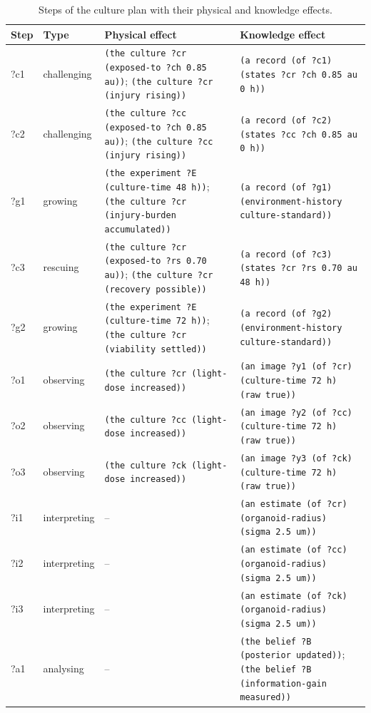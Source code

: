 \documentclass[10pt,a4paper]{article}
\begin{document}
\begin{table}[tbp]\centering\footnotesize
\caption{Steps of the culture plan with their physical and knowledge effects.}\label{tab:culture_steps}
\begin{tabularx}{\linewidth}{llXX}\toprule
\textbf{Step} & \textbf{Type} & \textbf{Physical effect} & \textbf{Knowledge effect} \\\midrule
?c1 & challenging & \texttt{(the culture ?cr (exposed-\allowbreak{}to ?ch 0.85 au))}; \texttt{(the culture ?cr (injury rising))} & \texttt{(a record (of ?c1) (states ?cr ?ch 0.85 au 0 h))} \\
?c2 & challenging & \texttt{(the culture ?cc (exposed-\allowbreak{}to ?ch 0.85 au))}; \texttt{(the culture ?cc (injury rising))} & \texttt{(a record (of ?c2) (states ?cc ?ch 0.85 au 0 h))} \\
?g1 & growing & \texttt{(the experiment ?E (culture-\allowbreak{}time 48 h))}; \texttt{(the culture ?cr (injury-\allowbreak{}burden accumulated))} & \texttt{(a record (of ?g1) (environment-\allowbreak{}history culture-\allowbreak{}standard))} \\
?c3 & rescuing & \texttt{(the culture ?cr (exposed-\allowbreak{}to ?rs 0.70 au))}; \texttt{(the culture ?cr (recovery possible))} & \texttt{(a record (of ?c3) (states ?cr ?rs 0.70 au 48 h))} \\
?g2 & growing & \texttt{(the experiment ?E (culture-\allowbreak{}time 72 h))}; \texttt{(the culture ?cr (viability settled))} & \texttt{(a record (of ?g2) (environment-\allowbreak{}history culture-\allowbreak{}standard))} \\
?o1 & observing & \texttt{(the culture ?cr (light-\allowbreak{}dose increased))} & \texttt{(an image ?y1 (of ?cr) (culture-\allowbreak{}time 72 h) (raw true))} \\
?o2 & observing & \texttt{(the culture ?cc (light-\allowbreak{}dose increased))} & \texttt{(an image ?y2 (of ?cc) (culture-\allowbreak{}time 72 h) (raw true))} \\
?o3 & observing & \texttt{(the culture ?ck (light-\allowbreak{}dose increased))} & \texttt{(an image ?y3 (of ?ck) (culture-\allowbreak{}time 72 h) (raw true))} \\
?i1 & interpreting & – & \texttt{(an estimate (of ?cr) (organoid-\allowbreak{}radius) (sigma 2.5 um))} \\
?i2 & interpreting & – & \texttt{(an estimate (of ?cc) (organoid-\allowbreak{}radius) (sigma 2.5 um))} \\
?i3 & interpreting & – & \texttt{(an estimate (of ?ck) (organoid-\allowbreak{}radius) (sigma 2.5 um))} \\
?a1 & analysing & – & \texttt{(the belief ?B (posterior updated))}; \texttt{(the belief ?B (information-\allowbreak{}gain measured))} \\\bottomrule
\end{tabularx}
\end{table}
\end{document}
